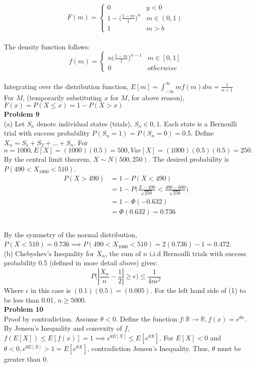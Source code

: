 \documentclass[letterpaper,12pt]{article}
\theoremstyle{definition}
\begin{document}
\begin{equation*}
F(m)=
\begin{cases}
0 & y < 0\\
1-\Big(\frac{1-m}{1}\Big)^n & m \in (0, 1)\\
1 & m>b
\end{cases}
\end{equation*}\\
The density function follows:
\begin{equation*}
f(m)=
\begin{cases}
n\Big(\frac{1-m}{1}\Big)^{n-1} & m \in [0,1]\\
0 & otherwise
\end{cases}
\end{equation*}\\
Integrating over the distribution function, $E[m]=\int_{-\infty}^{\infty}mf(m)dm = \frac{1}{n+1}$\\
For $M$, (temporarily substituting $x$ for $M$, for above reason), $F(x)=P(X \leq x) = 1-P(X>x)$\\

\noindent\textbf{Problem 9}\\
(a) Let $S_n$ denote individual states (trials), $S_n \in {0,1}$. Each state is a Bernoulli trial with success probability $P(S_n = 1) = P(S_n = 0) = 0.5$. Define $X_n = S_1 + S_2 + ... + S_n$. For $n=1000, E[X] = (1000)(0.5) = 500, Var[X] = (1000)(0.5)(0.5) = 250.$ By the central limit theorem, $X \sim N(500,250)$. The desired probability is $P(490<X_{1000}<510)$.
\begin{align*}
P(X>490) &= 1-P(X<490)\\
&= 1-P\Bigg(\frac{X-490}{\sqrt{250}} < \frac{490-600}{\sqrt{250}}\Bigg)\\
&= 1-\Phi(-0.632)\\
&= \Phi(0.632) = 0.736\\
\end{align*}\\
By the symmetry of the normal distribution, $P(X<510) = 0.736 \implies P(490<X_{1000}<510) = 2(0.736) - 1 = 0.472$.\newline\\
(b) Chebyshev's Inequality for $X_n$, the sum of $n$ i.i.d Bernoulli trials with success probability 0.5 (defined in more detail above) gives:
\begin{equation}
P\Bigg(\left|\frac{X_n}{n} - \frac{1}{2}\right| \geq \epsilon \Bigg) \leq \frac{1}{4n\epsilon^2}
\end{equation}
Where $\epsilon$ in this case is $(0.1)(0.5) = (0.005)$. For the left hand side of (1) to be less than 0.01, $n \geq 5000$.\\

\noindent\textbf{Problem 10}\\
Proof by contradiction. Assume $\theta < 0$. Define the function $f: \mathbb{R}\to \mathbb{R}, f(x) = e^{\theta x}$. By Jensen's Inequality and convexity of $f$, $f(E[X]) \leq E[f(x)] = 1 \implies e^{\theta E[X]} \leq E[e^{\theta X}].$ For $E[X]<0$ and $\theta<0, e^{\theta E[X]} > 1 = E[e^{\theta X}]$, contradiction Jensen's Inequality. Thus, $\theta$ must be greater than 0. 
\end{document}

